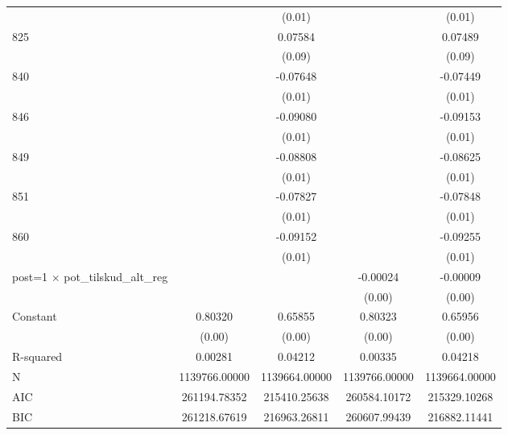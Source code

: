 \begin{table}[htbp]
\begin{tabular}{l*{4}{c}}
                    &                     &      (0.01)         &                     &      (0.01)         \\
825                 &                     &     0.07584         &                     &     0.07489         \\
                    &                     &      (0.09)         &                     &      (0.09)         \\
840                 &                     &    -0.07648\sym{***}&                     &    -0.07449\sym{***}\\
                    &                     &      (0.01)         &                     &      (0.01)         \\
846                 &                     &    -0.09080\sym{***}&                     &    -0.09153\sym{***}\\
                    &                     &      (0.01)         &                     &      (0.01)         \\
849                 &                     &    -0.08808\sym{***}&                     &    -0.08625\sym{***}\\
                    &                     &      (0.01)         &                     &      (0.01)         \\
851                 &                     &    -0.07827\sym{***}&                     &    -0.07848\sym{***}\\
                    &                     &      (0.01)         &                     &      (0.01)         \\
860                 &                     &    -0.09152\sym{***}&                     &    -0.09255\sym{***}\\
                    &                     &      (0.01)         &                     &      (0.01)         \\
post=1 $\times$ pot\_tilskud\_alt\_reg&                     &                     &    -0.00024\sym{***}&    -0.00009\sym{***}\\
                    &                     &                     &      (0.00)         &      (0.00)         \\
Constant            &     0.80320\sym{***}&     0.65855\sym{***}&     0.80323\sym{***}&     0.65956\sym{***}\\
                    &      (0.00)         &      (0.00)         &      (0.00)         &      (0.00)         \\
\hline
R-squared           &     0.00281         &     0.04212         &     0.00335         &     0.04218         \\
N                   &1139766.00000         &1139664.00000         &1139766.00000         &1139664.00000         \\
AIC                 &261194.78352         &215410.25638         &260584.10172         &215329.10268         \\
BIC                 &261218.67619         &216963.26811         &260607.99439         &216882.11441         \\
\hline\hline
\end{tabular}
\end{table}
